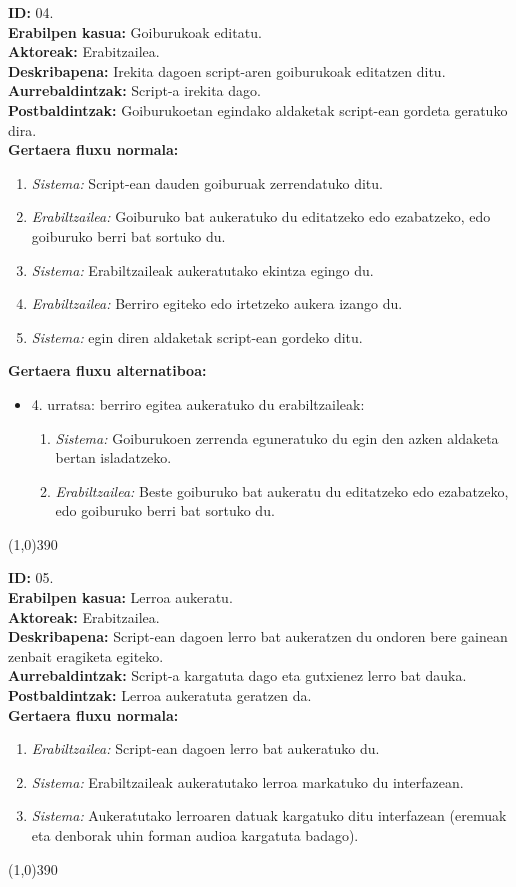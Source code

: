 \noindent
\textbf{ID:} 04.\\
\textbf{Erabilpen kasua:} Goiburukoak editatu.\\
\textbf{Aktoreak:} Erabitzailea.\\
\textbf{Deskribapena:} Irekita dagoen script-aren goiburukoak editatzen ditu.\\
\textbf{Aurrebaldintzak:} Script-a irekita dago.\\
\textbf{Postbaldintzak:} Goiburukoetan egindako aldaketak script-ean gordeta geratuko dira.\\
\textbf{Gertaera fluxu normala:}
\begin{enumerate}
	\item \textit{Sistema:} Script-ean dauden goiburuak zerrendatuko ditu.
	\item \textit{Erabiltzailea:} Goiburuko bat aukeratuko du editatzeko edo ezabatzeko, edo goiburuko berri bat sortuko du.
	\item \textit{Sistema:} Erabiltzaileak aukeratutako ekintza egingo du.
	\item \textit{Erabiltzailea:} Berriro egiteko edo irtetzeko aukera izango du.
	\item \textit{Sistema:} egin diren aldaketak script-ean gordeko ditu.
\end{enumerate}
\textbf{Gertaera fluxu alternatiboa:}
\begin{itemize}
	\item 4. urratsa: berriro egitea aukeratuko du erabiltzaileak:
		\begin{enumerate}
		\item \textit{Sistema:} Goiburukoen zerrenda eguneratuko du egin den azken aldaketa bertan isladatzeko.
		\item \textit{Erabiltzailea:} Beste goiburuko bat aukeratu du editatzeko edo ezabatzeko, edo goiburuko berri bat sortuko du.
		\end{enumerate}
\end{itemize}
\line(1,0){390}

\noindent
\textbf{ID:} 05.\\
\textbf{Erabilpen kasua:} Lerroa aukeratu.\\
\textbf{Aktoreak:} Erabitzailea.\\
\textbf{Deskribapena:} Script-ean dagoen lerro bat aukeratzen du ondoren bere gainean zenbait eragiketa egiteko.\\
\textbf{Aurrebaldintzak:}  Script-a kargatuta dago eta gutxienez lerro bat dauka.\\
\textbf{Postbaldintzak:} Lerroa aukeratuta geratzen da.\\
\textbf{Gertaera fluxu normala:}
\begin{enumerate}
	\item \textit{Erabiltzailea:} Script-ean dagoen lerro bat aukeratuko du.
	\item \textit{Sistema:} Erabiltzaileak aukeratutako lerroa markatuko du interfazean.
	\item \textit{Sistema:} Aukeratutako lerroaren datuak kargatuko ditu interfazean (eremuak eta denborak uhin forman audioa kargatuta badago).
\end{enumerate}
\line(1,0){390}

